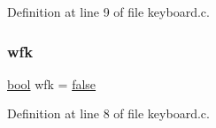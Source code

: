 Definition at line 9 of file keyboard.\+c.

\mbox{\label{a00038_a6ddd5223379778858edc46ffbec19775_a6ddd5223379778858edc46ffbec19775}} 
\subsubsection{\texorpdfstring{wfk}{wfk}}
{\footnotesize\ttfamily \hyperlink{a00140_af6a258d8f3ee5206d682d799316314b1_af6a258d8f3ee5206d682d799316314b1}{bool} wfk = \hyperlink{a00140_af6a258d8f3ee5206d682d799316314b1_af6a258d8f3ee5206d682d799316314b1ae9de385ef6fe9bf3360d1038396b884c}{false}}



Definition at line 8 of file keyboard.\+c.

